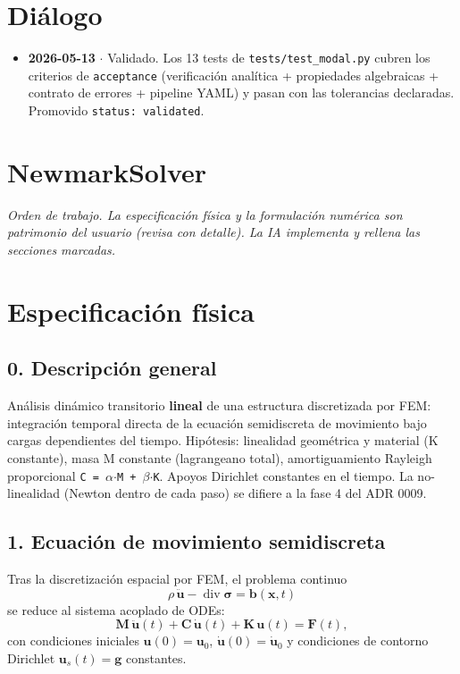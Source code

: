 \documentclass[11pt,letterpaper,oneside]{report}
\begin{document}
\section{Diálogo}

\begin{itemize}
  \item \textbf{2026-05-13} \ensuremath{\cdot} Validado. Los 13 tests de \texttt{tests/test\_modal.py} cubren los criterios de \texttt{acceptance} (verificación analítica + propiedades algebraicas + contrato de errores + pipeline YAML) y pasan con las tolerancias declaradas. Promovido \texttt{status: validated}.
\end{itemize}


\newpage

\section{NewmarkSolver}



\textit{Orden de trabajo. La especificación física y la formulación numérica son patrimonio del usuario (revisa con detalle). La IA implementa y rellena las secciones marcadas.}



\section{Especificación física}

\subsection{0. Descripción general}
Análisis dinámico transitorio \textbf{lineal} de una estructura discretizada por FEM: integración temporal directa de la ecuación semidiscreta de movimiento bajo cargas dependientes del tiempo. Hipótesis: linealidad geométrica y material (K constante), masa M constante (lagrangeano total), amortiguamiento Rayleigh proporcional \texttt{C = \ensuremath{\alpha}\ensuremath{\cdot}M + \ensuremath{\beta}\ensuremath{\cdot}K}. Apoyos Dirichlet constantes en el tiempo. La no-linealidad (Newton dentro de cada paso) se difiere a la fase 4 del ADR 0009.

\subsection{1. Ecuación de movimiento semidiscreta}
Tras la discretización espacial por FEM, el problema continuo
\[
\rho\,\ddot{\mathbf u} - \operatorname{div}\boldsymbol\sigma = \mathbf b(\mathbf x, t)
\]
se reduce al sistema acoplado de ODEs:
\[
\mathbf M\,\ddot{\mathbf u}(t) + \mathbf C\,\dot{\mathbf u}(t) + \mathbf K\,\mathbf u(t) = \mathbf F(t),
\]
con condiciones iniciales $\mathbf u(0) = \mathbf u_0$, $\dot{\mathbf u}(0) = \dot{\mathbf u}_0$ y condiciones de contorno Dirichlet $\mathbf u_s(t) = \mathbf g$ constantes.
\end{document}
